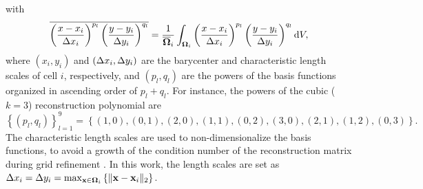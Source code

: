 with
\begin{equation}
	\overline{
		        \left(\frac{x - x_{i}}{\mathrm\Delta x_i}\right)^{p_l}
		        \left(\frac{y - y_{i}}{\mathrm\Delta y_i}\right)^{q_l}
		        }= \dfrac{1}{\overline{\mathbf{\Omega}}_i}\int_{\mathbf{\Omega}_i}   \left(\frac{x - x_{i}}{\mathrm\Delta x_i}\right)^{p_l}
		        \left(\frac{y - y_{i}}{\mathrm\Delta y_i}\right)^{q_l}  \dd V,
\end{equation} 
where $\left(x_i,y_i\right)$ and $\left(\mathrm\Delta x_i, \mathrm\Delta y_i\right)$ are the barycenter and characteristic length scales of cell $i$, respectively, and $\left(p_l,q_l\right)$ are the powers of the basis functions organized in ascending order of $p_l+q_l$. For instance, the powers of the cubic ($k=3$) reconstruction polynomial are 
\begin{equation}
	\left\{ \left(p_l,q_l\right) \right\}^9_{l=1}= \left\{ \left(1,0\right), \left(0,1\right), \left(2,0\right),\left(1,1\right),\left(0,2\right),\left(3,0\right),\left(2,1\right),\left(1,2\right),\left(0,3\right) \right\}.
\end{equation}
The characteristic length scales are used to non-dimensionalize the basis functions, to avoid a growth of the condition number of the reconstruction matrix during grid refinement \cite{abgrall1994essentially,friedrich1998weighted_WENO}. In this work, the length scales are set as $ \mathrm\Delta x_i = \mathrm\Delta y_i = \max_{\mathbf{x} \in \mathbf{\Omega}_i} \left\{\|\mathbf{x} - \mathbf{x}_{i}\|_2\right\}$. 

